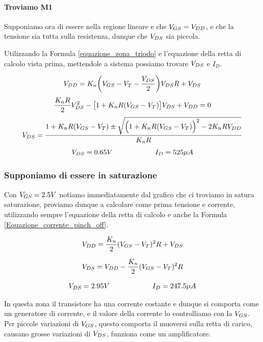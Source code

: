\paragraph{Troviamo M1}
Supponiamo ora di essere nella regione lineare e che $V_{GS}  = V_{DD}$, e che la tensione sia tutta sulla resistenza, dunque che $V_{DS}$ sia piccola.  

Utilizzando la Formula \ref{equazione_zona_triodo} e l'equazione della retta di calcolo vista prima, mettendole a sistema possiamo trovare $V_{DS}$ e $I_D$.

\begin{equation*}
    V_{DD} = K_n\biggl(V_{GS} - V_{T} - \frac{V_{DS}}{2}\biggl)V_{DS} R + V_{DS}
\end{equation*}
\begin{equation*}
    \frac{K_nR}{2}V_{DS}^2 - \big[1+K_nR(V_{GS} - V_{T})\big]V_{DS} + V_{DD} = 0
\end{equation*}
\begin{equation*}
    V_{DS} = \frac{1+K_nR(V_{GS} - V_{T})\pm \sqrt{\Big(1+K_nR(V_{GS} - V_{T})\Big)^2 - 2K_nRV_{DD}} }{K_nR}
\end{equation*}
\begin{equation*}
    V_{DS} = 0.65 V\qquad\qquad\qquad I_D = 525 \mu A
\end{equation*}

\subsubsection{Supponiamo di essere in saturazione}

Con $V_{GS} = 2.5V$ notiamo immediatamente dal grafico che ci troviamo in satura saturazione, proviamo dunque a calcolare come prima tensione e corrente, utilizzando sempre l'equazione della retta di calcolo e anche la Formula \ref{Equazione_corrente_pinch_off}.

\begin{equation*}
    V_{DD} = \frac{K_n}{2}(V_{GS}-V_{T})^2R + V_{DS}
\end{equation*}

\begin{equation}
    V_{DS} = V_{DD} - \frac{K_n}{2}(V_{GS}-V_{T})^2R
    \label{equazione_vds}
\end{equation}

\begin{equation*}
    V_{DS} = 2.95 V\qquad\qquad\qquad I_D = 247.5\mu A
\end{equation*}

In questa zona il transistore ha una corrente costante e dunque si comporta come un generatore di corrente, e il valore della corrente lo controlliamo con la $V_{GS}$. Per piccole variazioni di $V_{GS}$, questo comporta il muoversi sulla retta di carico, causano grosse variazioni di $V_{DS}$, funziona come un amplificatore.

